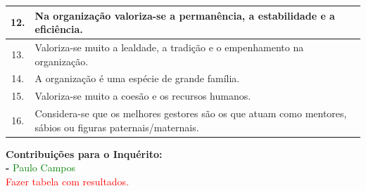 {\begin{table}[h!]
\begin{adjustbox}{max width=\textwidth}
\begin{tabular}{ |c|l| }
\hline
12. & Na organização valoriza-se a permanência, a estabilidade e a eficiência. \\
\hline
13. & Valoriza-se muito a lealdade, a tradição e o empenhamento na organização. \\
\hline
14. & A organização é uma espécie de grande família. \\
\hline
15. & Valoriza-se muito a coesão e os recursos humanos.  \\
\hline
16. & \makecell[l]{Considera-se que os melhores gestores são os que atuam como mentores, \\ sábios ou figuras paternais/maternais.} \\
\hline
\end{tabular}
\end{adjustbox}
\end{table}

\textbf{Contribuições para o Inquérito:}\\
\textbf{-} \; \textcolor{green}{Paulo Campos}\\



\textcolor{red}{Fazer tabela com resultados.}









}
